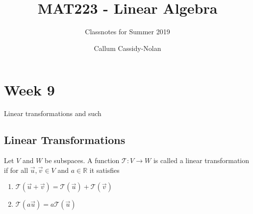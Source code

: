 \documentclass[notoc,notitlepage]{tufte-book}
\title{MAT223 - Linear Algebra}
\author{Callum Cassidy-Nolan}
\subtitle{Classnotes for Summer 2019}
\begin{document}


\chapter{Week 9}%
\label{chp:week_9}

Linear transformations and such

\section{Linear Transformations}%
\label{sec:linear_transformations}

\begin{defn}\label{defn:linear_transformation}
    Let $V$ and $W$ be subspaces. A function $\mathcal{T} : V \to W $ is called
    a linear transformation if for all $\vec{u}, \vec{v} \in V$ and $a \in \mathbb{R}$ it satisfies
    \begin{enumerate}
        \item $\mathcal{T}(\vec{u} + \vec{v}) = \mathcal{T}(\vec{u}) + \mathcal{T}(\vec{v})$ 
        \item $\mathcal{T}(a \vec{u}) = a \mathcal{T}(\vec{u})$ 
    \end{enumerate}
\end{defn}
\end{document}
